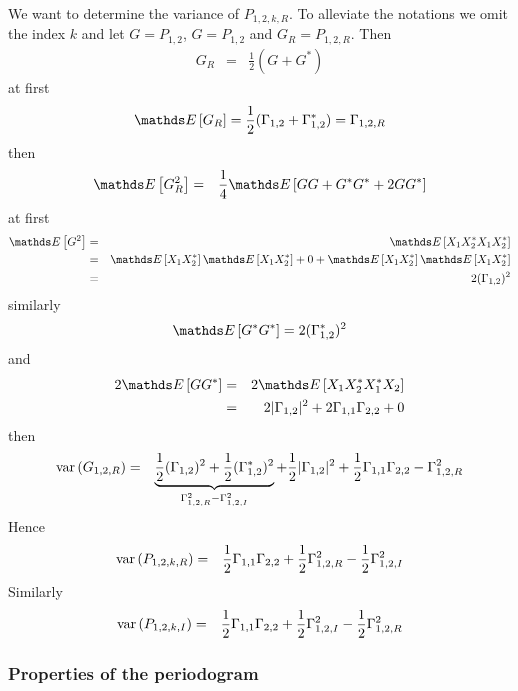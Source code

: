 \begin{example}
We want to determine the variance of $P_{1,2,k,R}$. To alleviate the notations we omit the index $k$ and  let $G=P_{1,2}$, $G=P_{1,2}$ and $G_{R}=P_{1,2,R}$. Then
\begin{eqnarray*}
 G_{R}&=&\frac{1}{2}(G+G^{*})
\end{eqnarray*}
at first
$$
\esp{G_{R}}=\frac{1}{2}(\Gamma_{1,2}+\Gamma_{1,2}^{*})=\Gamma_{1,2,R}
$$
then
\begin{eqnarray*}
 \esp{G_{R}^{2}}&=& \frac{1}{4}\esp{GG+G^{*}G^{*}+2GG^{*}}
\end{eqnarray*}
at first
\begin{eqnarray*}
\esp{G^{2}} &=& \esp{X_{1}X_{2}^{*}X_{1}X_{2}^{*}}
\\
&=&\esp{X_{1}X_{2}^{*}}\esp{X_{1}X_{2}^{*}}+0+\esp{X_{1}X_{2}^{*}}\esp{X_{1}X_{2}^{*}}
\\
&=&2(\Gamma_{1,2})^{2}
\end{eqnarray*}
similarly
$$
\esp{G^{*}G^{*}}=2(\Gamma_{1,2}^{*})^{2}
$$
and
\begin{eqnarray*}
2\esp{GG^{*}} &=& 2\esp{X_{1}X_{2}^{*}X_{1}^{*}X_{2}}
\\
&=&2|\Gamma_{1,2}|^{2}+2\Gamma_{1,1}\Gamma_{2,2}+0
\end{eqnarray*}
then
\begin{eqnarray*}
 \mathrm{var}\left( G_{1,2,R} \right)
 &=&
 \underbrace{\frac{1}{2}(\Gamma_{1,2})^{2}+\frac{1}{2}(\Gamma_{1,2}^{*})^{2}}
 _{\Gamma_{1,2,R}^{2}-\Gamma_{1,2,I}^{2}}
 +\frac{1}{2}|\Gamma_{1,2}|^{2}+\frac{1}{2}\Gamma_{1,1}\Gamma_{2,2}
 -\Gamma_{1,2,R}^{2}
\end{eqnarray*}
Hence
\begin{eqnarray*}
 \mathrm{var}\left( P_{1,2,k,R} \right)
 &=&
 \frac{1}{2}\Gamma_{1,1}\Gamma_{2,2}
 +\frac{1}{2}\Gamma_{1,2,R}^{2}
 -\frac{1}{2}\Gamma_{1,2,I}^{2}
\end{eqnarray*}
Similarly 
\begin{eqnarray*}
 \mathrm{var}\left( P_{1,2,k,I} \right)
 &=&
 \frac{1}{2}\Gamma_{1,1}\Gamma_{2,2}
 +\frac{1}{2}\Gamma_{1,2,I}^{2}
 -\frac{1}{2}\Gamma_{1,2,R}^{2}
\end{eqnarray*}
\end{example}



 \subsubsection{Properties of the periodogram}
 
